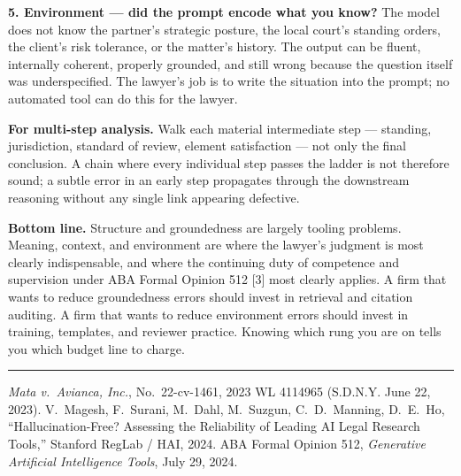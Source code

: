 \documentclass[11pt,a4paper]{article}
\begin{document}
\textbf{5. Environment --- did the prompt encode what you know?}
The model does not know the partner's strategic posture, the local
court's standing orders, the client's risk tolerance, or the
matter's history. The output can be fluent, internally coherent,
properly grounded, and still wrong because the question itself was
underspecified. The lawyer's job is to write the situation into
the prompt; no automated tool can do this for the lawyer.

\textbf{For multi-step analysis.} Walk each material intermediate
step --- standing, jurisdiction, standard of review, element
satisfaction --- not only the final conclusion. A chain where
every individual step passes the ladder is not therefore sound;
a subtle error in an early step propagates through the downstream
reasoning without any single link appearing defective.

\textbf{Bottom line.}
Structure and groundedness are largely tooling problems. Meaning,
context, and environment are where the lawyer's judgment is most
clearly indispensable, and where the continuing duty of competence
and supervision under ABA Formal Opinion 512 [3] most clearly
applies. A firm that wants to reduce groundedness errors should
invest in retrieval and citation auditing. A firm that wants to
reduce environment errors should invest in training, templates,
and reviewer practice. Knowing which rung you are on tells you
which budget line to charge.

\vspace{0.5em}
\hrule
\vspace{0.4em}

{\small
\noindent
[1] \emph{Mata v.~Avianca, Inc.}, No.~22-cv-1461, 2023 WL 4114965
(S.D.N.Y. June 22, 2023).
\quad
[2] V.~Magesh, F.~Surani, M.~Dahl, M.~Suzgun, C.~D.~Manning,
D.~E.~Ho, ``Hallucination-Free? Assessing the Reliability of
Leading AI Legal Research Tools,'' Stanford RegLab / HAI, 2024.
\quad
[3] ABA Formal Opinion 512, \emph{Generative Artificial
Intelligence Tools}, July 29, 2024.
}
\end{document}
